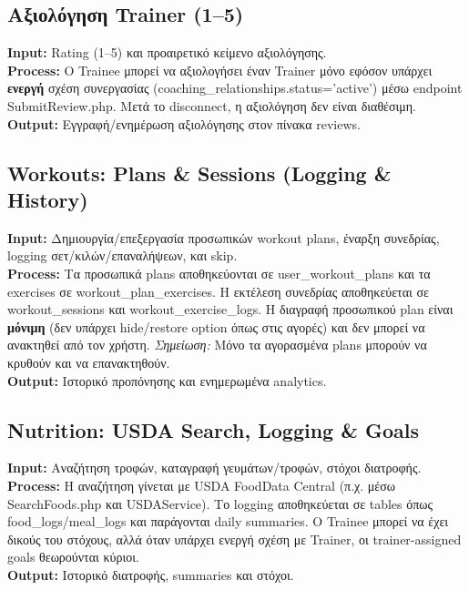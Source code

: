 \documentclass[12pt,a4paper]{report}
\begin{document}
\subsection{Αξιολόγηση Trainer (1--5)}
\textbf{Input:} Rating (1--5) και προαιρετικό κείμενο αξιολόγησης. \\
\textbf{Process:} Ο Trainee μπορεί να αξιολογήσει έναν Trainer μόνο εφόσον υπάρχει \textbf{ενεργή} σχέση συνεργασίας (\textenglish{coaching\_relationships.status='active'}) μέσω endpoint \textenglish{SubmitReview.php}. Μετά το disconnect, η αξιολόγηση δεν είναι διαθέσιμη. \\
\textbf{Output:} Εγγραφή/ενημέρωση αξιολόγησης στον πίνακα \textenglish{reviews}.

\subsection{Workouts: Plans \& Sessions (Logging \& History)}
\textbf{Input:} Δημιουργία/επεξεργασία προσωπικών workout plans, έναρξη συνεδρίας, logging σετ/κιλών/επαναλήψεων, και \textenglish{skip}. \\
\textbf{Process:} Τα προσωπικά plans αποθηκεύονται σε \textenglish{user\_workout\_plans} και τα exercises σε \textenglish{workout\_plan\_exercises}. Η εκτέλεση συνεδρίας αποθηκεύεται σε \textenglish{workout\_sessions} και \textenglish{workout\_exercise\_logs}. Η διαγραφή προσωπικού plan είναι \textbf{μόνιμη} (δεν υπάρχει hide/restore option όπως στις αγορές) και δεν μπορεί να ανακτηθεί από τον χρήστη. \textit{Σημείωση:} Μόνο τα αγορασμένα plans μπορούν να κρυθούν και να επανακτηθούν. \\
\textbf{Output:} Ιστορικό προπόνησης και ενημερωμένα analytics.

\subsection{Nutrition: USDA Search, Logging \& Goals}
\textbf{Input:} Αναζήτηση τροφών, καταγραφή γευμάτων/τροφών, στόχοι διατροφής. \\
\textbf{Process:} Η αναζήτηση γίνεται με USDA FoodData Central (π.χ. μέσω \textenglish{SearchFoods.php} και \textenglish{USDAService}). Το logging αποθηκεύεται σε tables όπως \textenglish{food\_logs/meal\_logs} και παράγονται daily summaries. Ο Trainee μπορεί να έχει δικούς του στόχους, αλλά όταν υπάρχει ενεργή σχέση με Trainer, οι trainer-assigned goals θεωρούνται κύριοι. \\
\textbf{Output:} Ιστορικό διατροφής, summaries και στόχοι.
\end{document}

